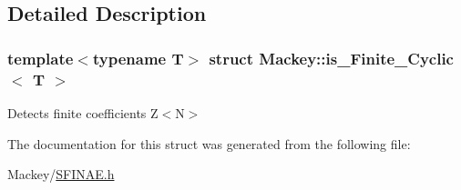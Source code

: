\subsection{Detailed Description}
\subsubsection*{template$<$typename T$>$\newline
struct Mackey\+::is\+\_\+\+Finite\+\_\+\+Cyclic$<$ T $>$}

Detects finite coefficients Z$<$\+N$>$ 

The documentation for this struct was generated from the following file\+:\begin{DoxyCompactItemize}
\item 
Mackey/\hyperlink{SFINAE_8h}{S\+F\+I\+N\+A\+E.\+h}\end{DoxyCompactItemize}
